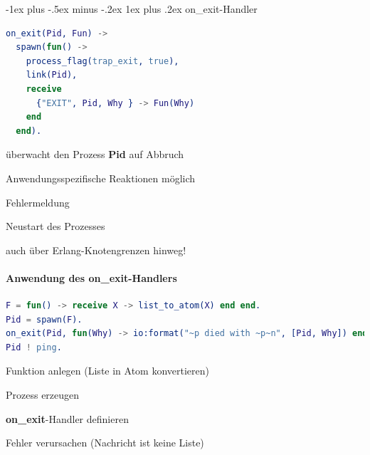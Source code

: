 \documentclass[10pt]{article}
\makeatletter
\renewcommand{\subsubsection}{\@startsection{subsubsection}{3}{0mm}%
                                {-1ex plus -.5ex minus -.2ex}%
                                {1ex plus .2ex}%
                                {\normalfont\small\bfseries}}
\makeatother
\begin{document}
\subsubsection{on\_exit-Handler}
\begin{lstlisting}[language=erlang]
on_exit(Pid, Fun) ->
  spawn(fun() ->
    process_flag(trap_exit, true),
    link(Pid),
    receive
      {"EXIT", Pid, Why } -> Fun(Why)
    end
  end).
\end{lstlisting}

\begin{itemize*}
  \item überwacht den Prozess \textbf{Pid} auf Abbruch
  \item Anwendungsspezifische Reaktionen möglich
  \begin{itemize*}
    \item Fehlermeldung
    \item Neustart des Prozesses
  \end{itemize*}
  \item auch über Erlang-Knotengrenzen hinweg!
\end{itemize*}

\paragraph{Anwendung des on\_exit-Handlers}
\begin{lstlisting}[language=erlang]
F = fun() -> receive X -> list_to_atom(X) end end.
Pid = spawn(F).
on_exit(Pid, fun(Why) -> io:format("~p died with ~p~n", [Pid, Why]) end).
Pid ! ping.
\end{lstlisting}

\begin{itemize*}
  \item Funktion anlegen (Liste in Atom konvertieren)
  \item Prozess erzeugen
  \item \textbf{on\_exit}-Handler definieren
  \item Fehler verursachen (Nachricht ist keine Liste)
\end{itemize*}
\end{document}
